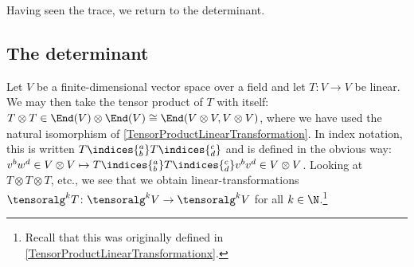 Having seen the trace, we return to the determinant.

\subsection{The determinant}

Let $V$ be a finite-dimensional vector space over a field and let $T\colon V\rightarrow V$ be linear.  We may then take the tensor product of $T$ with itself:  $T\otimes T\in \End (V)\otimes \End (V)\cong \End (V\otimes V,V\otimes V)$, where we have used the natural isomorphism of \cref{TensorProductLinearTransformation}.  In index notation, this is written $T\indices{^a_b}T\indices{^c_d}$ and is defined in the obvious way:  $v^bw^d\in V\otimes V\mapsto T\indices{^a_b}T\indices{^c_d}v^bv^d\in V\otimes V$.  Looking at $T\otimes T\otimes T$, etc., we see that we obtain linear-transformations $\tensoralg ^kT\colon \tensoralg ^kV\rightarrow \tensoralg ^kV$ for all $k\in \N$.\footnote{Recall that this was originally defined in \cref{TensorProductLinearTransformationx}.}

